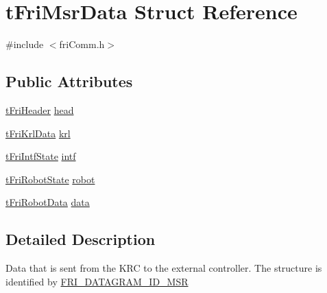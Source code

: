 \hypertarget{structtFriMsrData}{\section{t\-Fri\-Msr\-Data \-Struct \-Reference}
\label{structtFriMsrData}
}


{\ttfamily \#include $<$fri\-Comm.\-h$>$}

\subsection*{\-Public \-Attributes}
\begin{DoxyCompactItemize}
\item 
\hyperlink{structtFriHeader}{t\-Fri\-Header} \hyperlink{structtFriMsrData_aa238c9c08bac43877e4775b1dd6ece81}{head}
\item 
\hyperlink{structtFriKrlData}{t\-Fri\-Krl\-Data} \hyperlink{structtFriMsrData_a8bbe1d55480dbbe23097b0996ea9569b}{krl}
\item 
\hyperlink{structtFriIntfState}{t\-Fri\-Intf\-State} \hyperlink{structtFriMsrData_a860e45b85966489f6503a2d613c58206}{intf}
\item 
\hyperlink{structtFriRobotState}{t\-Fri\-Robot\-State} \hyperlink{structtFriMsrData_aa76db4b0dacb1075ebf3d9f3d1e3e214}{robot}
\item 
\hyperlink{structtFriRobotData}{t\-Fri\-Robot\-Data} \hyperlink{structtFriMsrData_a051008bb4f37efc95dadb2a723641401}{data}
\end{DoxyCompactItemize}


\subsection{\-Detailed \-Description}
\-Data that is sent from the \-K\-R\-C to the external controller. \-The structure is identified by \hyperlink{friComm_8h_a092832df6922a47ece50740c0505836c}{\-F\-R\-I\-\_\-\-D\-A\-T\-A\-G\-R\-A\-M\-\_\-\-I\-D\-\_\-\-M\-S\-R} 

